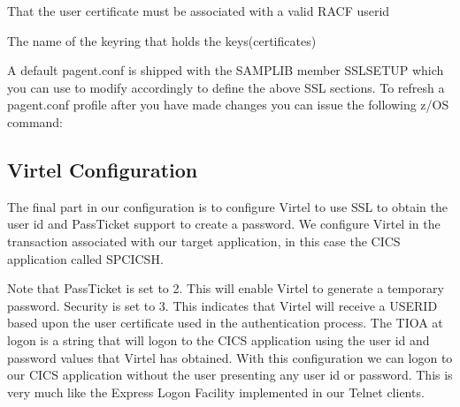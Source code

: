 \documentclass[letterpaper,10pt,english]{sphinxmanual}
\begin{document}
That the user certificate must be associated with a valid RACF userid

\begin{sphinxVerbatim}[commandchars=\\\{\}]
 
\end{sphinxVerbatim}

The name of the keyring that holds the keys(certificates)

\begin{sphinxVerbatim}[commandchars=\\\{\}]
 
\end{sphinxVerbatim}

A default pagent.conf is shipped with the SAMPLIB member SSLSETUP which you can use to modify accordingly to define the above SSL sections. To refresh a pagent.conf profile after you have made changes you can issue the following z/OS command:

\begin{sphinxVerbatim}[commandchars=\\\{\}]
 
\end{sphinxVerbatim}


\subsection{Virtel Configuration}
\label{\detokenize{TN202002:virtel-configuration}}
The final part in our configuration is to configure Virtel to use SSL to obtain the user id and PassTicket support to create a password. We configure Virtel in the transaction associated with our target application, in this case the CICS application called SPCICSH.



Note that PassTicket is set to 2. This will enable Virtel to generate a temporary password. Security is set to 3. This indicates that Virtel will receive a USERID based upon the user certificate used in the authentication process. The TIOA at logon is a string that will logon to the CICS application using the user id and password values that Virtel has obtained. With this configuration we can logon to our CICS application without the user presenting any user id or password. This is very much like the Express Logon Facility implemented in our Telnet clients.
\end{document}
